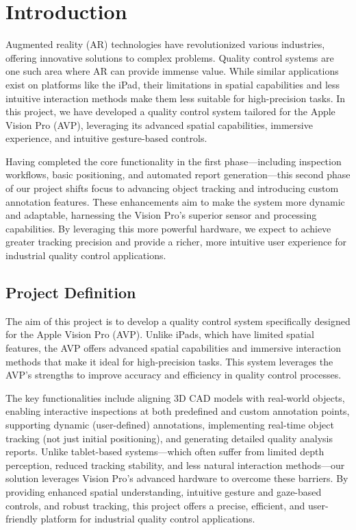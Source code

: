 \chapter{Introduction}

Augmented reality (AR) technologies have revolutionized various industries, offering innovative solutions to complex problems. Quality control systems are one such area where AR can provide immense value. While similar applications exist on platforms like the iPad, their limitations in spatial capabilities and less intuitive interaction methods make them less suitable for high-precision tasks. In this project, we have developed a quality control system tailored for the Apple Vision Pro (AVP), leveraging its advanced spatial capabilities, immersive experience, and intuitive gesture-based controls.

Having completed the core functionality in the first phase—including inspection workflows, basic positioning, and automated report generation—this second phase of our project shifts focus to advancing object tracking and introducing custom annotation features. These enhancements aim to make the system more dynamic and adaptable, harnessing the Vision Pro’s superior sensor and processing capabilities. By leveraging this more powerful hardware, we expect to achieve greater tracking precision and provide a richer, more intuitive user experience for industrial quality control applications.

\section{Project Definition}

The aim of this project is to develop a quality control system specifically designed for the Apple Vision Pro (AVP). Unlike iPads, which have limited spatial features, the AVP offers advanced spatial capabilities and immersive interaction methods that make it ideal for high-precision tasks. This system leverages the AVP’s strengths to improve accuracy and efficiency in quality control processes.

The key functionalities include aligning 3D CAD models with real-world objects, enabling interactive inspections at both predefined and custom annotation points, supporting dynamic (user-defined) annotations, implementing real-time object tracking (not just initial positioning), and generating detailed quality analysis reports. Unlike tablet-based systems—which often suffer from limited depth perception, reduced tracking stability, and less natural interaction methods—our solution leverages Vision Pro’s advanced hardware to overcome these barriers. By providing enhanced spatial understanding, intuitive gesture and gaze-based controls, and robust tracking, this project offers a precise, efficient, and user-friendly platform for industrial quality control applications.


